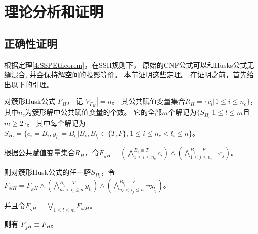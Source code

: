 \section{理论分析和证明}
\subsection{正确性证明}\label{4:correctness}

根据定理\ref{4:SSPEtheorem}，在SSH规则下，
原始的CNF公式可以和Husks公式无缝混合, 并会保持解空间的投影等价。
本节证明这些定理。
在证明之前，首先给出以下的引理。

\begin{lemma}\label{4:CHE}

对簇形Husk公式 ${F_H}$，
记$|V_{F_H}|= n$。
其公共赋值变量集合$R_H=\{c_i|1\leqslant i\leqslant n_c\}$，
其中$n_c$为簇形解中公共赋值变量的个数。
它的全部$m$个解记为$\{S_{H_l}|1\leqslant l\leqslant m $且 $m \geqslant 2\}$。
其中每个解记为
$S_{H_l}=\{c_i=B_i, y_{l_i}=B_{l_i}|B_i,B_{l_i} \in \{T,F\}, 1\leqslant i\leqslant n_c \lessdot {l_i}\leqslant n\}$。


根据公共赋值变量集合$R_H$，令$F_{_RH}=
(\bigwedge_{1\leqslant i\leqslant n_c}^{B_i\equiv T} c_i)\wedge
(\bigwedge_{1\leqslant j\leqslant n_c}^{B_j\equiv F}\neg c_j)$。

则对簇形Husk公式的任一解$S_{H_l}$，令$F_{slH}=F_{_RH}\wedge
(\bigwedge_{n_c\lessdot l_i\leqslant n}^{B_{l_i}\equiv T} y_{l_i})\wedge
(\bigwedge_{n_c\lessdot l_j\leqslant n}^{B_{l_j}\equiv F}\neg y_{l_j})$。

并且令$F_{_SH}=\bigvee_{1\leqslant l\leqslant m}F_{slH}$。

\textbf{则有}  $F_{_SH} \equiv F_H $。
\end{lemma}

